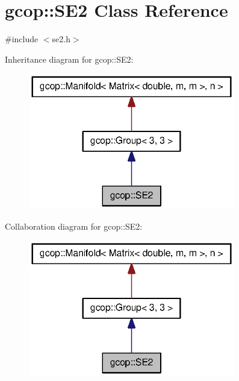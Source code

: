 \section{gcop\-:\-:\-S\-E2 \-Class \-Reference}
\label{classgcop_1_1SE2}


{\ttfamily \#include $<$se2.\-h$>$}



\-Inheritance diagram for gcop\-:\-:\-S\-E2\-:
\nopagebreak
\begin{figure}[H]
\begin{center}
\leavevmode
\includegraphics[width=256pt]{classgcop_1_1SE2__inherit__graph}
\end{center}
\end{figure}


\-Collaboration diagram for gcop\-:\-:\-S\-E2\-:
\nopagebreak
\begin{figure}[H]
\begin{center}
\leavevmode
\includegraphics[width=256pt]{classgcop_1_1SE2__coll__graph}
\end{center}
\end{figure}

